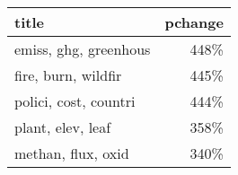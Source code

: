 \begin{tabular}{p{1.2cm}r}
\toprule
                 title &  pchange \\
\midrule
 emiss, ghg, greenhous &     448\% \\
   fire, burn, wildfir &     445\% \\
 polici, cost, countri &     444\% \\
     plant, elev, leaf &     358\% \\
    methan, flux, oxid &     340\% \\
\bottomrule
\end{tabular}
